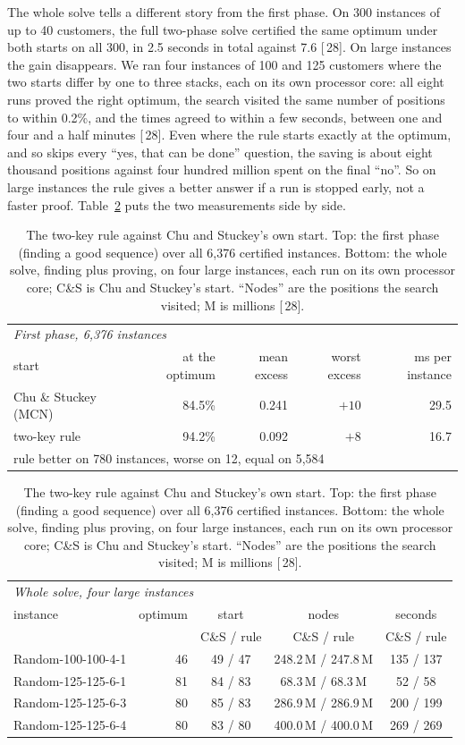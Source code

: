 \documentclass[11pt,a4paper]{article}
\renewcommand{\S}[1]{[\textsection\,#1]}
\begin{document}
The whole solve tells a different story from the first phase. On 300
instances of up to 40 customers, the full two-phase solve certified the same
optimum under both starts on all 300, in 2.5 seconds in total against 7.6
\S{28}. On large instances the gain disappears. We ran four instances of 100
and 125 customers where the two starts differ by one to three stacks, each
on its own processor core: all eight runs proved the right optimum, the
search visited the same number of positions to within 0.2\%, and the times
agreed to within a few seconds, between one and four and a half minutes
\S{28}. Even where the rule starts exactly at the optimum, and so skips every
``yes, that can be done'' question, the saving is about eight thousand
positions against four hundred million spent on the final ``no''. So on
large instances the rule gives a better answer if a run is stopped early,
not a faster proof. Table~\ref{tab:seedphases} puts the two measurements
side by side.

\begin{table}[t]
\centering
\small
\caption{The two-key rule against Chu and Stuckey's own start. Top: the
first phase (finding a good sequence) over all 6,376 certified instances.
Bottom: the whole solve, finding plus proving, on four large instances, each
run on its own processor core; C\&S is Chu and Stuckey's start. ``Nodes'' are the positions the search
visited; M is millions \S{28}.}
\label{tab:seedphases}
\begin{tabular}{lrrrr}
\toprule
\multicolumn{5}{l}{\emph{First phase, 6,376 instances}} \\
start & at the optimum & mean excess & worst excess & ms per instance \\
\midrule
Chu \& Stuckey (MCN) & 84.5\% & 0.241 & $+10$ & 29.5 \\
two-key rule & 94.2\% & 0.092 & $+8$ & 16.7 \\
\midrule
\multicolumn{5}{l}{rule better on 780 instances, worse on 12, equal on 5,584} \\
\bottomrule
\end{tabular}

\medskip

\begin{tabular}{lrccc}
\toprule
\multicolumn{5}{l}{\emph{Whole solve, four large instances}} \\
instance & optimum & start & nodes & seconds \\
 & & C\&S / rule & C\&S / rule & C\&S / rule \\
\midrule
Random-100-100-4-1 & 46 & 49 / 47 & 248.2\,M / 247.8\,M & 135 / 137 \\
Random-125-125-6-1 & 81 & 84 / 83 & 68.3\,M / 68.3\,M & 52 / 58 \\
Random-125-125-6-3 & 80 & 85 / 83 & 286.9\,M / 286.9\,M & 200 / 199 \\
Random-125-125-6-4 & 80 & 83 / 80 & 400.0\,M / 400.0\,M & 269 / 269 \\
\bottomrule
\end{tabular}
\end{table}
\end{document}
